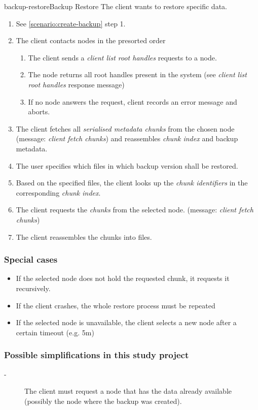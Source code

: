 \begin{scenario}{backup-restore}{Backup Restore}
	The client wants to restore specific data.
	
	\begin{enumerate}
		\item See \ref{scenario:create-backup} step 1.
		\item The client contacts nodes in the presorted order
			\begin{enumerate}
				\item The client sends a \emph{client list root handles} requests to a node.
				\item The node returns all root handles present in the system (see \emph{client list root handles} response message)
				\item If no node answers the request, client records an error message and aborts.
			\end{enumerate}
		\item The client fetches all \emph{serialised metadata chunks} from the chosen node (message: \emph{client fetch chunks}) and reassembles \emph{chunk index} and backup metadata.
		\item The user specifies which files in which backup version shall be restored. %
		\item Based on the specified files, the client looks up the \emph{chunk identifiers} in the corresponding \emph{chunk index}.
		\item The client requests the \emph{chunks} from the selected node. (message: \emph{client fetch chunks})
		\item The client reassembles the chunks into files.
	\end{enumerate}
	
	\subsubsection{Special cases}
	\begin{itemize}
		\item If the selected node does not hold the requested chunk, it requests it recursively.
		\item If the client crashes, the whole restore process must be repeated
		\item If the selected node is unavailable, the client selects a new node after a certain timeout (e.g. 5m)
	\end{itemize}
    
	\subsubsection{Possible simplifications in this study project}
	\begin{description}
		\item[-] The client must request a node that has the data already available (possibly the node where the backup was created).
	\end{description}
\end{scenario}


